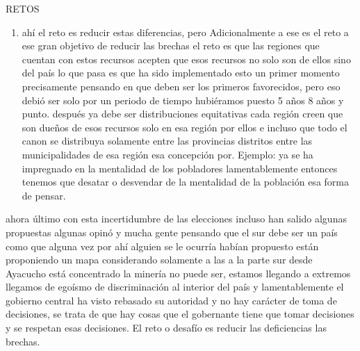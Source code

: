 \documentclass[
  jou,
  floatsintext,
  longtable,
  a4paper,
  nolmodern,
  notxfonts,
  notimes,
  12pt,
  colorlinks=true,linkcolor=blue,citecolor=blue,urlcolor=blue]{apa7}
\providecommand{\tightlist}{%
  \setlength{\itemsep}{0pt}\setlength{\parskip}{0pt}}
\begin{document}
RETOS

\begin{enumerate}
\def\labelenumi{\arabic{enumi}.}
\setcounter{enumi}{2}
\tightlist
\item
  ahí el reto es reducir estas diferencias, pero Adicionalmente a ese es
  el reto a ese gran objetivo de reducir las brechas el reto es que las
  regiones que cuentan con estos recursos acepten que esos recursos no
  solo son de ellos sino del país lo que pasa es que ha sido
  implementado esto un primer momento precisamente pensando en que deben
  ser los primeros favorecidos, pero eso debió ser solo por un periodo
  de tiempo hubiéramos puesto 5 años 8 años y punto. después ya debe ser
  distribuciones equitativas cada región creen que son dueños de esos
  recursos solo en esa región por ellos e incluso que todo el canon se
  distribuya solamente entre las provincias distritos entre las
  municipalidades de esa región esa concepción por. Ejemplo: ya se ha
  impregnado en la mentalidad de los pobladores lamentablemente entonces
  tenemos que desatar o desvendar de la mentalidad de la población esa
  forma de pensar.
\end{enumerate}

ahora último con esta incertidumbre de las elecciones incluso han salido
algunas propuestas algunas opinó y mucha gente pensando que el sur debe
ser un país como que alguna vez por ahí alguien se le ocurría habían
propuesto están proponiendo un mapa considerando solamente a las a la
parte sur desde Ayacucho está concentrado la minería no puede ser,
estamos llegando a extremos llegamos de egoísmo de discriminación al
interior del país y lamentablemente el gobierno central ha visto
rebasado su autoridad y no hay carácter de toma de decisiones, se trata
de que hay cosas que el gobernante tiene que tomar decisiones y se
respetan esas decisiones. El reto o desafío es reducir las deficiencias
las brechas.
\end{document}
